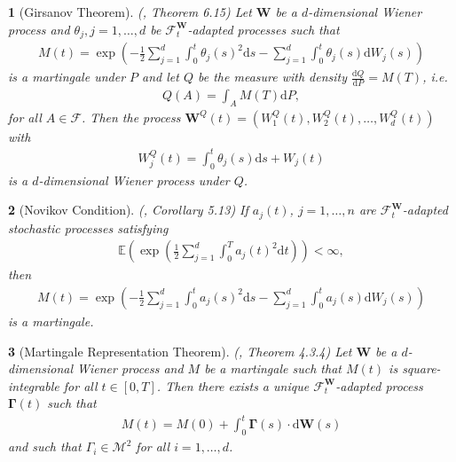 \documentclass[english]{article}
\numberwithin{equation}{section}
\numberwithin{figure}{section}
\theoremstyle{bolddescit}
\newtheorem{theorem}{\protect\theoremname}[section]
\theoremstyle{definition}
\theoremstyle{definition}
\theoremstyle{plain}
\theoremstyle{plain}
\theoremstyle{bolddesc}
\theoremstyle{plain}
\theoremstyle{remark}
\providecommand{\theoremname}{Theorem}
\begin{document}
\begin{theorem}[Girsanov Theorem]\label{thm:girsanov}
  (\cite{capinski_blackscholes_2012}, Theorem 6.15)
  Let $\mathbf{W}$ be a $d$-dimensional Wiener process and $\theta_j, j=1,\ldots,d$ be $\mathcal{F}^\mathbf{W}_t$-adapted processes such that
  \begin{align*}
    M(t) = \exp \left( - \frac{1}{2} \sum_{j=1}^d \int_0^t \theta_j(s)^2 \mathrm{d}s - \sum_{j=1}^d \int_0^t \theta_j(s) \mathrm{d}W_j(s) \right)
  \end{align*}
  is a martingale under $P$ and let $Q$ be the measure with density $\frac{\mathrm{d}Q}{\mathrm{d}P} = M(T)$, i.e.
  \begin{align*}
    Q(A) = \int_A M(T) \mathrm{d}P,
  \end{align*}
  for all $A \in \mathcal{F}$.
  Then the process $\mathbf{W}^Q(t) = (W^Q_1(t), W^Q_2(t), \ldots, W^Q_d(t))$ with
  \begin{align*}
    W^Q_j(t) = \int_0^t \theta_j(s) \mathrm{d}s + W_j(t)
  \end{align*}
  is a $d$-dimensional Wiener process under $Q$.
\end{theorem}

\begin{theorem}[Novikov Condition]\label{thm:novikov}
  (\cite{karatzas_brownian_1998}, Corollary 5.13)
  If $a_j(t)$, $j=1,\ldots,n$ are $\mathcal{F}^\mathbf{W}_t$-adapted stochastic processes satisfying
  \begin{align*}
    \mathbb{E}\left(\exp \left(\frac{1}{2} \sum_{j=1}^d \int_0^T a_j(t)^2 \mathrm{d}t\right)\right) < \infty,
  \end{align*}
  then
  \begin{align*}
    M(t) = \exp \left( - \frac{1}{2} \sum_{j=1}^{d} \int_0^t a_j(s)^2 \mathrm{d}s - \sum_{j=1}^{d} \int_0^t a_j(s) \mathrm{d}W_j(s) \right)
  \end{align*}
  is a martingale.
\end{theorem}

\begin{theorem}[Martingale Representation Theorem]\label{thm:martingale-representation}
  (\cite{oksendal_stochastic_2003}, Theorem 4.3.4)
  Let $\mathbf{W}$ be a $d$-dimensional Wiener process and $M$ be a martingale such that $M(t)$ is square-integrable for all $t \in [0,T]$. Then there exists a unique $\mathcal{F}^\mathbf{W}_t$-adapted process $\mathbf{\Gamma}(t)$ such that
  \begin{align*}
    M(t) = M(0) + \int_0^t \mathbf{\Gamma}(s) \cdot \mathrm{d}\mathbf{W}(s)
  \end{align*}
  and such that $\Gamma_i \in \mathcal{M}^2$ for all $i=1,\ldots,d$.
\end{theorem}
\end{document}
